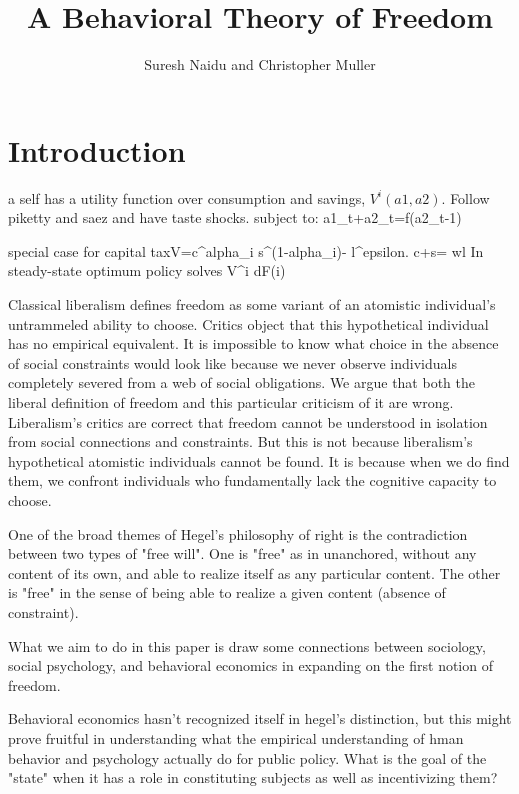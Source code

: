 \documentclass[10pt,a4paper]{article}
\title{A Behavioral Theory of Freedom}
\author{Suresh Naidu and Christopher Muller}
\begin{document}
\maketitle

\begin{abstract}
\end{abstract}

\setcounter{page}{0}
\thispagestyle{empty}

\renewcommand{\baselinestretch}{1.4}\large\normalsize

\section*{Introduction}

a self has a utility function over consumption and savings, $V^i(a1,a2)$. Follow piketty and saez and have taste shocks.
subject to: a1_t+a2_t=f(a2_t-1)

special case for capital taxV=c^alpha_i s^(1-alpha_i)- l^epsilon.
c+s= wl 
In steady-state optimum policy solves \int V^i dF(i)

\noindent Classical liberalism defines freedom as some variant of an atomistic individual's untrammeled ability to choose. Critics object that this hypothetical individual has no empirical equivalent. It is impossible to know what choice in the absence of social constraints would look like because we never observe individuals completely severed from a web of social obligations. We argue that both the liberal definition of freedom and this particular criticism of it are wrong. Liberalism's critics are correct that freedom cannot be understood in isolation from social connections and constraints. But this is not because liberalism's hypothetical atomistic individuals cannot be found. It is because when we do find them, we confront individuals who fundamentally lack the cognitive capacity to choose. 

One of the broad themes of Hegel's philosophy of right is the contradiction between two types of "free will".
One is "free" as in unanchored, without any content of its own, and able to realize itself as any particular content.
The other is "free" in the sense of being able to realize a given content (absence of constraint).

What we aim to do in this paper is draw some connections between sociology, social psychology, and behavioral economics 
in expanding on the first notion of freedom. 

Behavioral economics hasn't recognized itself in hegel's distinction, but this might prove fruitful in understanding what the empirical
understanding of hman behavior and psychology actually do for public policy. What is the goal of the "state" when it has a role in constituting subjects
as well as incentivizing them?
\end{document}
